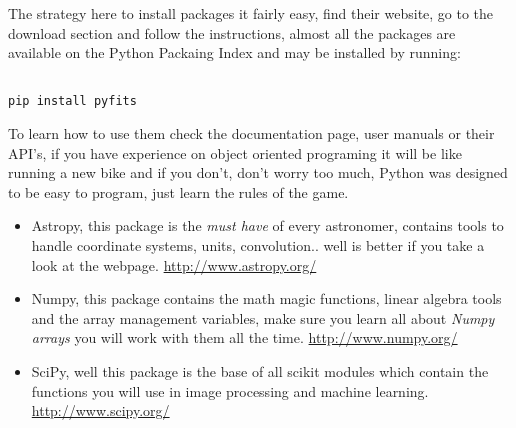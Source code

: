 \documentclass[11pt,fleqn]{book} %
\begin{document}
\begin{description}
\begin{description}
																																																																																																						            The strategy here to install packages it fairly easy, find their website, go to the download section and follow the instructions, almost all the packages are available on the Python Packaing Index and may be installed by running:
																																																																																																							            \begin{verbatim}
																																																																																																								            	pip install pyfits
																																																																																																										        \end{verbatim}
																																																																																																											        To learn how to use them check the documentation page, user manuals or their API's, if you have experience on object oriented programing it will be like running a new bike and if you don't, don't worry too much, Python was designed to be easy to program, just learn the rules of the game.
																																																																																																												        	\begin{itemize}
																																																																																																														            	\item Astropy, this package is the \emph{must have} of every astronomer, contains tools to handle coordinate systems, units, convolution.. well is better if you take a look at the webpage. \url{http://www.astropy.org/}
																																																																																																																                \item Numpy, this package contains the math magic functions, linear algebra tools and the array management variables, make sure you learn all about \emph{Numpy arrays} you will work with them all the time. \url{http://www.numpy.org/}
																																																																																																																		                \item SciPy, well this package is the base of all scikit modules which contain the functions you will use in image processing and machine learning. \url{http://www.scipy.org/}
																																																																																																																				                	\begin{itemize}

\end{itemize}
\end{itemize}
\end{description}
\end{description}
\end{document}
